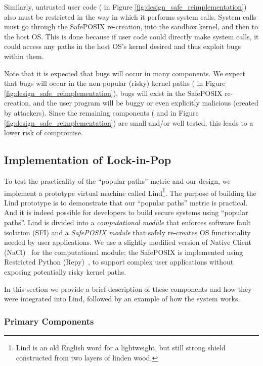 Similarly, untrusted user code ( in Figure \ref{fig:design_safe_reimplementation}) also must be restricted in the way
in which it performs system calls.
System calls must go through the SafePOSIX re-creation, into the sandbox kernel, and then to the host OS.
This is done because if user code could directly make system calls, it could access any paths in the host OS's kernel desired
and thus exploit bugs within them.

Note that it is expected that bugs will occur in many components.
We expect that bugs will occur in the non-popular (risky) kernel paths ( in Figure \ref{fig:design_safe_reimplementation}),
bugs will exist in the SafePOSIX re-creation, and the user program will be buggy or even explicitly malicious (created by attackers).
Since the remaining components ( and  in Figure \ref{fig:design_safe_reimplementation})
are small and/or well tested, this leads to a lower risk of compromise.

\subsection{Implementation of Lock-in-Pop}
\label{implementation}

To test the practicality of the ``popular paths'' metric and our \lip design, 
we implement a prototype virtual machine
called Lind\footnote{\scriptsize Lind is an old English word for a lightweight, but still strong shield
constructed from two layers of linden wood.}. The purpose of building the Lind prototype is to demonstrate that 
our ``popular paths'' metric is practical. And it is indeed possible for developers to build secure systems using 
``popular paths''. 
Lind is divided into a \emph{computational module} that enforces software fault isolation (SFI) and a
\emph{SafePOSIX module} that safely re-creates OS functionality needed by user
applications.  We use a slightly modified version of Native Client
(NaCl)~\cite{NaCl-09} for the computational module; the SafePOSIX is
implemented using Restricted Python (Repy)~\cite{Repy-10}, to support
complex user applications without exposing potentially risky kernel paths.

In this section we provide a brief description of these components and how they
were integrated into Lind, followed by an example of how the system works.

\subsubsection{Primary Components}

